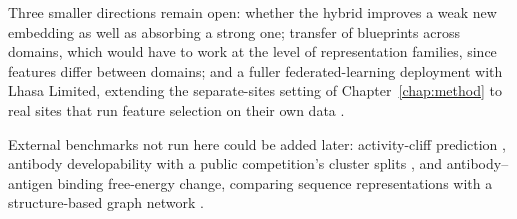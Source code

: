 Three smaller directions remain open: whether the hybrid improves a weak new embedding as well as absorbing a strong one; transfer of blueprints across domains, which would have to work at the level of representation families, since features differ between domains; and a fuller federated-learning deployment with Lhasa Limited, extending the separate-sites setting of Chapter~\ref{chap:method} to real sites that run feature selection on their own data \citep{McMahan2017}.

External benchmarks not run here could be added later: activity-cliff prediction \citep{Dablander2023}, antibody developability with a public competition's cluster splits \citep{vanNiekerk2026}, and antibody--antigen binding free-energy change, comparing sequence representations with a structure-based graph network \citep{Hummer2025}.


